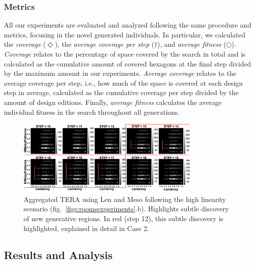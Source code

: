 \subsubsection{Metrics}

All our experiments are evaluated and analyzed following the same procedure and metrics, focusing in the novel generated individuals. In particular, we calculated the \textit{coverage} ($\Diamond$), the \textit{average coverage per step} ($\dagger$), and \textit{average fitness} ($\bigcirc$). \textit{Coverage} relates to the percentage of space covered by the search in total and is calculated as the cumulative amount of covered hexagons at the final step divided by the maximum amount in our experiments. \textit{Average coverage} relates to the average coverage per step, i.e., how much of the space is covered at each design step in average, calculated as the cumulative coverage per step divided by the amount of design editions. Finally, \textit{average fitness} calculates the average individual fitness in the search throughout all generations.




\begin{figure}[t!]
\centerline{\includegraphics[width=0.8\textwidth]{figures/exp2-highlin-exploringchamber/accumulative__X-len-Y-mesoPat-simplify-2.png}}
\caption{Aggregated TERA using Len and Meso following the high linearity scenario (fig.~\ref{figs:roomsexperiments}.b). Highlights subtle discovery of new generative regions.  In red (step 12), this subtle discovery is highlighted, explained in detail in Case 2.}
\label{figs:exp2}
\end{figure}

\subsection{Results and Analysis}

